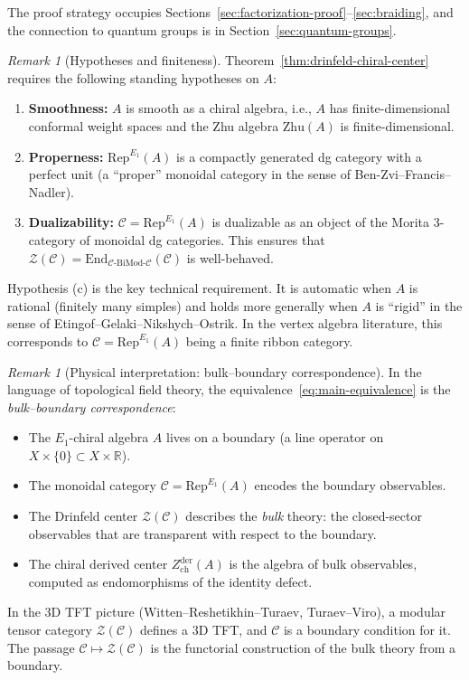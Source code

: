 \documentclass[11pt]{article}
\theoremstyle{definition}
\theoremstyle{remark}
\newtheorem{remark}[theorem]{Remark}
\newcommand{\Rep}{\mathrm{Rep}}
\newcommand{\End}{\mathrm{End}}
\newcommand{\cC}{\mathcal{C}}
\newcommand{\cZ}{\mathcal{Z}}
\newcommand{\Zder}{Z^{\mathrm{der}}_{\mathrm{ch}}}
\newcommand{\BiMod}{\mathrm{BiMod}}
\begin{document}
The proof strategy occupies Sections~\ref{sec:factorization-proof}--\ref{sec:braiding}, and the connection to quantum groups is in Section~\ref{sec:quantum-groups}.

\begin{remark}[Hypotheses and finiteness]
\label{rem:hypotheses}
Theorem~\ref{thm:drinfeld-chiral-center} requires the following standing hypotheses on $A$:
\begin{enumerate}[label=(\alph*)]
 \item \textbf{Smoothness:} $A$ is smooth as a chiral algebra, i.e., $A$ has finite-dimensional conformal weight spaces and the Zhu algebra $\mathrm{Zhu}(A)$ is finite-dimensional.
 \item \textbf{Properness:} $\Rep^{E_1}(A)$ is a compactly generated dg category with a perfect unit (a ``proper'' monoidal category in the sense of Ben-Zvi--Francis--Nadler).
 \item \textbf{Dualizability:} $\cC = \Rep^{E_1}(A)$ is dualizable as an object of the Morita 3-category of monoidal dg categories. This ensures that $\cZ(\cC) = \End_{\cC\text{-}\BiMod\text{-}\cC}(\cC)$ is well-behaved.
\end{enumerate}
Hypothesis (c) is the key technical requirement. It is automatic when $A$ is rational (finitely many simples) and holds more generally when $A$ is ``rigid'' in the sense of Etingof--Gelaki--Nikshych--Ostrik. In the vertex algebra literature, this corresponds to $\cC = \Rep^{E_1}(A)$ being a finite ribbon category.
\end{remark}

\begin{remark}[Physical interpretation: bulk--boundary correspondence]
\label{rem:bulk-boundary}
In the language of topological field theory, the equivalence~\eqref{eq:main-equivalence} is the \emph{bulk--boundary correspondence}:
\begin{itemize}
 \item The $E_1$-chiral algebra $A$ lives on a boundary (a line operator on $X \times \{0\} \subset X \times \mathbb{R}$).
 \item The monoidal category $\cC = \Rep^{E_1}(A)$ encodes the boundary observables.
 \item The Drinfeld center $\cZ(\cC)$ describes the \emph{bulk} theory: the closed-sector observables that are transparent with respect to the boundary.
 \item The chiral derived center $\Zder(A)$ is the algebra of bulk observables, computed as endomorphisms of the identity defect.
\end{itemize}
In the 3D TFT picture (Witten--Reshetikhin--Turaev, Turaev--Viro), a modular tensor category $\cZ(\cC)$ defines a 3D TFT, and $\cC$ is a boundary condition for it. The passage $\cC \mapsto \cZ(\cC)$ is the functorial construction of the bulk theory from a boundary.
\end{remark}
\end{document}
